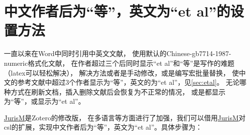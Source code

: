 \documentclass[cn,11pt,chinese]{elegantbook}
\begin{document}
		\section{中文作者后为“等”，英文为“et al”的设置方法}\label{sec:etal_set}	
			一直以来在Word中同时引用中英文文献，
			使用默认的Chinese-gb7714-1987-numeric格式化文献，
			在作者超过三个后同时显示“et al”和“等”是写作的难题（latex可以轻松解决），
			解决方法或者是手动修改，或是编写宏批量替换，
			使中文的参考文献中超过3个作者显示为“等”，英文的为“et al”，见\cref{sec:etal}。
			无论哪种方式在刷新文档，插入删除文献后会恢复为不正常的情况，
			或是都显示为“等”，或显示为“et al”。


			\href{https://juris-m.github.io/release/}{JurisM}是Zotero的修改版，
			在多语言等方面进行了加强，我们可以借用\href{https://juris-m.github.io/release/}
			{JurisM}对csl的扩展，实现中文作者后为“等”，英文为“et al”。具体步骤为：
\end{document}
